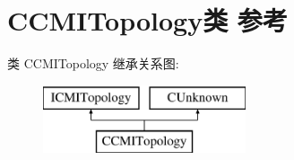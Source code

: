 \hypertarget{class_c_c_m_i_topology}{}\section{C\+C\+M\+I\+Topology类 参考}
\label{class_c_c_m_i_topology}
类 C\+C\+M\+I\+Topology 继承关系图\+:\begin{figure}[H]
\begin{center}
\leavevmode
\includegraphics[height=2.000000cm]{class_c_c_m_i_topology}
\end{center}
\end{figure}
